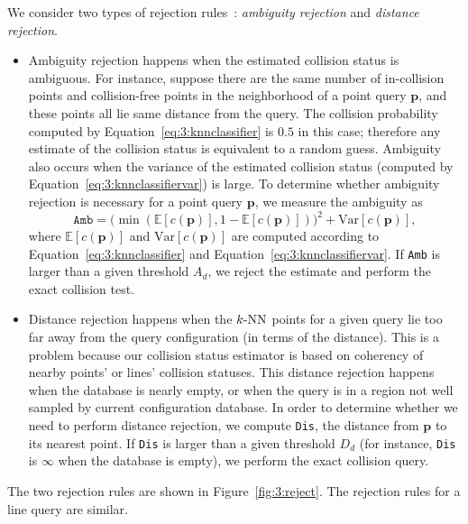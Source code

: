 We consider two types of rejection rules~\cite{Dubuisson:1993:PR}: \emph{ambiguity rejection} and \emph{distance rejection}.
\begin{itemize}
\item Ambiguity rejection happens when the estimated collision status is ambiguous. For instance, suppose there are the same number of in-collision points and collision-free points in the neighborhood of a point query $\mathbf p$, and these points all lie same distance from the query. The collision probability computed by Equation~\ref{eq:3:knnclassifier} is $0.5$ in this case; therefore any estimate of the collision status is equivalent to a random guess. Ambiguity also occurs when the variance of the estimated collision status (computed by Equation~\ref{eq:3:knnclassifiervar}) is large. To determine whether ambiguity rejection is necessary for a point query $\mathbf p$, we measure the ambiguity as
    \begin{equation}
    \texttt{Amb} = \big(\min(\mathbb E[c(\mathbf p)], 1 - \mathbb E[c(\mathbf p)])\big)^2 + \textrm{Var}[c(\mathbf p)],
    \end{equation}
    where $\mathbb E[c(\mathbf p)]$ and $\textrm{Var}[c(\mathbf p)]$ are computed according to Equation~\ref{eq:3:knnclassifier} and Equation~\ref{eq:3:knnclassifiervar}. If \texttt{Amb} is larger than a given threshold $A_d$, we reject the estimate and perform the exact collision test.

\item Distance rejection happens when the $k\text{-NN}$ points for a given query lie too far away from the query configuration (in terms of the distance). This is a problem because our collision status estimator is based on coherency of nearby points' or lines' collision statuses. This distance rejection happens when the database is nearly empty, or when the query is in a region not well sampled by current configuration database.
    In order to determine whether we need to perform distance rejection, we compute \texttt{Dis}, the distance from $\mathbf p$ to its nearest point. If \texttt{Dis} is larger than a given threshold $D_d$ (for instance, \texttt{Dis} is $\infty$ when the database is empty), we perform the exact collision query.
\end{itemize}

The two rejection rules are shown in Figure~\ref{fig:3:reject}. The rejection rules for a line query are similar.

